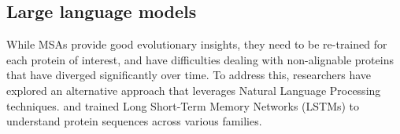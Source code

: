 \subsection{Large language models}


While MSAs provide good evolutionary insights, they need to be re-trained for each protein of interest, and have difficulties dealing with non-alignable proteins that have diverged significantly over time. To address this, researchers have explored an alternative approach that leverages Natural Language Processing techniques. \citet{alley2019unified} and \citet{heinzinger2019modeling} trained Long Short-Term Memory Networks (LSTMs) to understand protein sequences across various families.

